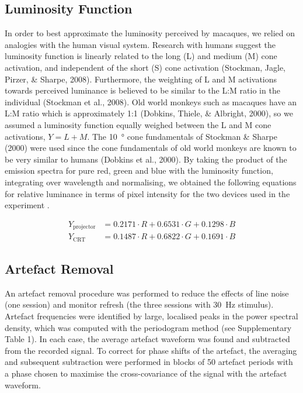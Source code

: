 \subsection{Luminosity Function}
In order to best approximate the luminosity perceived by macaques, we relied on analogies with the human visual system.
Research with humans suggest the luminosity function is linearly related to the long (L) and medium (M) cone activation, and independent of the short (S) cone activation (Stockman, Jagle, Pirzer, \& Sharpe, 2008).
Furthermore, the weighting of L and M activations towards perceived luminance is believed to be similar to the L:M ratio in the individual (Stockman et al., 2008).
Old world monkeys such as macaques have an L:M ratio which is approximately 1:1 (Dobkins, Thiele, \& Albright, 2000), so we assumed a luminosity function equally weighed between the L and M cone activations,  $Y=L+M$.
The \SI{10}{\degree} cone fundamentals of Stockman \& Sharpe (2000) were used since the cone fundamentals of old world monkeys are known to be very similar to humans (Dobkins et al., 2000).
By taking the product of the emission spectra for pure red, green and blue with the luminosity function, integrating over wavelength and normalising, we obtained the following equations for relative luminance in terms of pixel intensity for the two devices used in the experiment .

\begin{align*}
    Y_{\text{projector}} &= 0.2171 \cdot R + 0.6531 \cdot G + 0.1298 \cdot B\\
    Y_{\text{CRT}}       &= 0.1487 \cdot R + 0.6822 \cdot G + 0.1691 \cdot B
\end{align*}

\subsection{Artefact Removal}
An artefact removal procedure was performed to reduce the effects of line noise (one session) and monitor refresh (the three sessions with \SI{30}{Hz} stimulus).
Artefact frequencies were identified by large, localised peaks in the power spectral density, which was computed with the periodogram method (see Supplementary Table 1).
In each case, the average artefact waveform was found and subtracted from the recorded signal.
To correct for phase shifts of the artefact, the averaging and subsequent subtraction were performed in blocks of 50 artefact periods with a phase chosen to maximise the cross-covariance of the signal with the artefact waveform.


